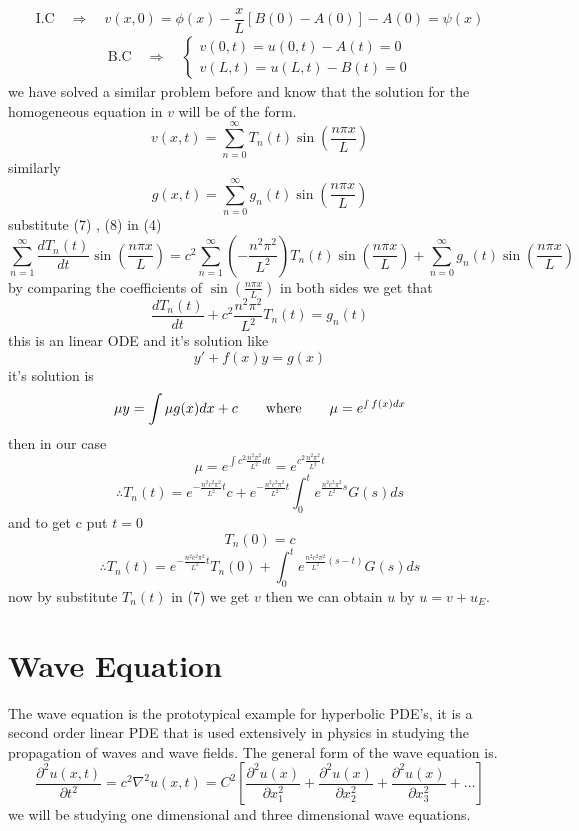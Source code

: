 \documentclass[]{article}
\begin{document}
\begin{equation}
    \text{I.C} \quad \Longrightarrow \quad v(x,0) = \phi(x) - \frac{x}{L}[B(0)-A(0)] -A(0)= \psi(x)
\end{equation}
\begin{align}
    \text{B.C} \quad \Longrightarrow \quad
    \begin{cases}
        v(0,t) = u(0,t) - A(t) = 0
        \\
        v(L,t)= u(L,t) - B(t) = 0        
    \end{cases}    
\end{align}
we have solved a similar problem before and know that the solution for the homogeneous equation in $v$ will be of the form.
\begin{equation}
v(x,t) = \sum_{n=0}^{\infty} T_n (t) \sin\left(\frac{n\pi x}{L}\right)
\end{equation}
similarly 
\begin{equation}
    g(x,t) = \sum_{n=0}^{\infty} g_n (t) \sin\left(\frac{n\pi x}{L}\right)
\end{equation}
substitute (7) , (8) in (4)
\[
    \sum_{n=1}^{\infty} \frac{d T_n (t)}{dt}\sin\left(\frac{n\pi x}{L}\right) 
    = c^2 \sum_{n=1}^{\infty} \left(-\frac{n^2 \pi^2}{L^2}\right) T_n(t)\sin\left(\frac{n\pi x}{L}\right)
    + \sum_{n=0}^{\infty} g_n (t) \sin\left(\frac{n\pi x}{L}\right)
\]
by comparing the coefficients of $\sin\left(\frac{n\pi x}{L}\right)$ in both sides we get that 
\[
    \frac{d T_n (t)}{dt}+c^2\frac{n^2 \pi^2}{L^2} T_n(t)
    =g_n(t)
\]
this is an linear ODE and it's solution like
\[
    y'+f(x)y = g(x)
\]
it's solution is 
\[
\mu y = \int \mu g(x) dx + c \quad\quad \text{where} \quad\quad \mu = e^{\smallint f(x) dx}
\]
then in our case
\[
\mu = e^{\int c^2\frac{n^2 \pi^2}{L^2} dt} = e^{c^2\frac{n^2 \pi^2}{L^2} t}
\]
\[
\therefore T_n(t) = e^{-\frac{n^2 c^2 \pi^2}{L^2}t}c + e^{-\frac{n^2 c^2 \pi^2}{L^2}t}\int_{0}^{t} e^{\frac{n^2 c^2 \pi^2}{L^2}s} G(s) ds
\]
and to get c put $t = 0$
\[
T_n(0) = c
\]
\[
  \therefore  T_n (t) = e^{-\frac{n^2 c^2 \pi^2}{L^2}t}T_n(0) +\int_{0}^{t} e^{\frac{n^2 c^2 \pi^2}{L^2}(s-t)} G(s) ds    
\]
now by substitute $T_n (t)$ in (7) we get $v$ then we can obtain $u$ by $u = v + u_E$.


\section{Wave Equation}
The wave equation is the prototypical example for hyperbolic PDE's, it is a second order linear PDE that is used extensively in physics in studying the propagation of waves and wave fields. The general form of the wave equation is.
\[
\frac{\partial^2 u(x,t)}{\partial t^2} = c^2\nabla^2 u(x,t) = C^2\left[\frac{\partial^2 u(x)}{\partial x^{2}_{1}} + \frac{\partial^2 u(x)}{\partial x^{2}_{2}} + \frac{\partial^2 u(x)}{\partial x^{2}_{3}} + \dots\right]    
\]
we will be studying one dimensional and three dimensional wave equations.
\setcounter{equation}{0}
\end{document}
